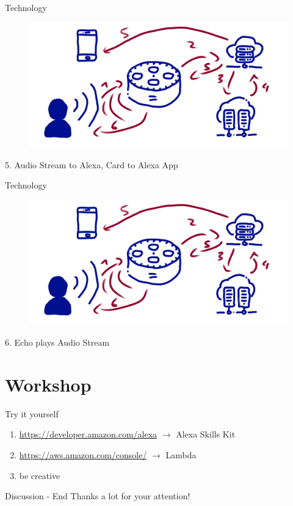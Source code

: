 \documentclass[aspectratio=169]{beamer}
\begin{document}
\begin{frame}{Technology}
\begin{figure}
	\includegraphics[width=0.9\linewidth]{images/alexatech}
\end{figure}
5. Audio Stream to Alexa, Card to Alexa App
\end{frame}

\begin{frame}{Technology}
\begin{figure}
	\includegraphics[width=0.9\linewidth]{images/alexatech}
\end{figure}
6. Echo plays Audio Stream
\end{frame}



\section{Workshop}
\begin{frame}{Try it yourself}
\centering
\begin{enumerate}
	\item \url{https://developer.amazon.com/alexa} $\rightarrow$ Alexa Skills Kit
	
	\item \url{https://aws.amazon.com/console/} $\rightarrow$ Lambda
	
	\item be creative
	
\end{enumerate}
\end{frame}

\begin{frame}{Discussion - End}
	\centering
	\huge{Thanks a lot for your attention!}
\end{frame}
\end{document}
